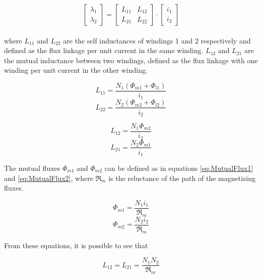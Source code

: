 \begin{equation} \label{eq:FluxLinkageInductances}
	\begin{bmatrix}
		\lambda_1\\
		\lambda_2
	\end{bmatrix}
		=
	\begin{bmatrix}
		L_{11} & L_{12}\\
		L_{21} & L_{22}
	\end{bmatrix}
		\cdot
	\begin{bmatrix}
		i_1\\
		i_2		
	\end{bmatrix}
\end{equation}
\\
where $L_{11}$ and $L_{22}$ are the self inductances of windings 1 and 2 respectively and defined as the flux linkage per unit current in the same winding. $L_{12}$ and $L_{21}$ are the mutual inductance between two windings, defined as the flux linkage with one winding per unit current in the other winding.

\begin{equation}
	L_{11} = \frac{N_1(\Phi_{m1} + \Phi_{l1})}{i_1}
\end{equation}
\begin{equation}
	L_{22} =  \frac{N_2(\Phi_{m2} + \Phi_{l2})}{i_2}
\end{equation}

\begin{equation}
	L_{12} = \frac{N_1 \Phi_{m2}}{i_2}
\end{equation}
\begin{equation}
	L_{21} = \frac{N_2 \Phi_{m1}}{i_1}
\end{equation}

The mutual fluxes $\Phi_{m1}$ and $\Phi_{m2}$ can be defined as in equations \ref{eq:MutualFlux1} and \ref{eq:MutualFlux2}, where $\Re_m$ is the reluctance of the path of the magnetizing fluxes. 

\begin{equation} \label{eq:MutualFlux1}
	\Phi_{m1} = \frac{N_1 i_1}{\Re_m} 
\end{equation} 
\begin{equation} \label{eq:MutualFlux2}
	\Phi_{m2} = \frac{N_2 i_2}{\Re_m} 
\end{equation}

From these equations, it is possible to see that

\begin{equation}
	L_{12}=L_{21}= \frac{N_1 N_2}{\Re_m}
\end{equation}

